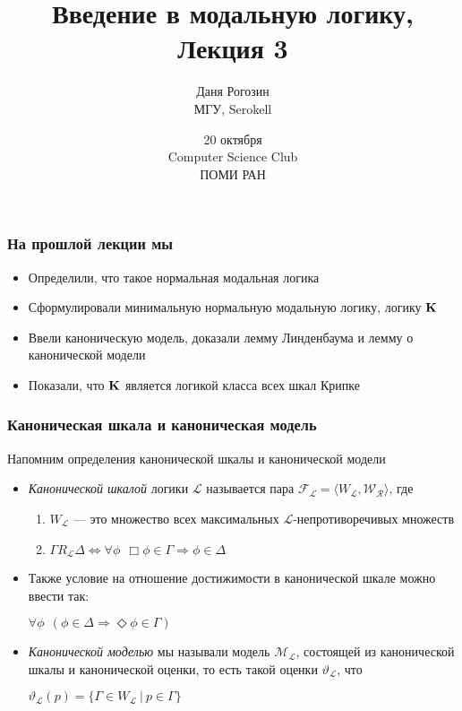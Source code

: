 \documentclass[pdf,utf8,russian,aspectratio=169]{beamer}
\title{Введение в модальную логику, \\ Лекция 3}
\author{Даня Рогозин \\ МГУ, Serokell}
\date{20 октября \\ Computer Science Club \\ ПОМИ РАН}
\begin{document}
\maketitle

\begin{frame}
  \frametitle{На прошлой лекции мы}

  \begin{itemize}
    \item Определили, что такое нормальная модальная логика
    \item Сформулировали минимальную нормальную модальную логику, логику ${\bf K}$
    \item Ввели каноническую модель, доказали лемму Линденбаума и лемму о канонической модели
    \item Показали, что ${\bf K}$ является логикой класса всех шкал Крипке
  \end{itemize}
\end{frame}


\begin{frame}
  \frametitle{Каноническая шкала и каноническая модель}

  Напомним определения канонической шкалы и канонической модели
\begin{itemize}
\item \emph{Канонической шкалой} логики $\mathcal{L}$ называется пара $\mathcal{F}_{\mathcal{L}} = \langle W_{\mathcal{L}}, \mathcal{W}_{\mathcal{R}} \rangle$, где
\begin{enumerate}
  \item $W_{\mathcal{L}}$ --- это множество всех максимальных $\mathcal{L}$-непротиворечивых множеств
  \item $\Gamma R_{\mathcal{L}} \Delta \Leftrightarrow \forall \phi \:\: \Box \phi \in \Gamma \Rightarrow \phi \in \Delta$
  \end{enumerate}
  \item Также условие на отношение достижимости в канонической шкале можно ввести так:
  \begin{center}
    $\forall \phi \:\: (\phi \in \Delta \Rightarrow \Diamond \phi \in \Gamma)$
  \end{center}
  \item \emph{Канонической моделью} мы называли модель $\mathcal{M}_{\mathcal{L}}$, состоящей из канонической шкалы и канонической оценки, то есть такой оценки $\vartheta_{\mathcal{L}}$, что
  \begin{center}
    $\vartheta_{\mathcal{L}}(p) = \{ \Gamma \in W_{\mathcal{L}} \: | \: p \in \Gamma \}$
  \end{center}
\end{itemize}
\end{frame}
\end{document}
